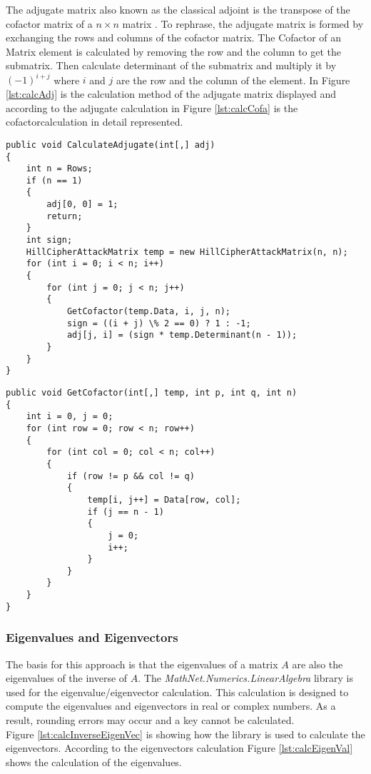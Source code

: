 \documentclass[conference]{IEEEtran}
\begin{document}
The adjugate matrix also known as the classical adjoint is the transpose of the cofactor matrix of a \( n \times n \) matrix . To rephrase, the adjugate matrix is formed by exchanging the rows and columns of the cofactor matrix.
The Cofactor of an Matrix element is calculated by removing the row and the column to get the submatrix. Then calculate determinant of the submatrix and multiply it by \((-1)^{i+j}\) where \(i\) and \(j\) are the row and the column of the element. 
In Figure \ref{lst:calcAdj} is the calculation method of the adjugate matrix displayed and according to the adjugate calculation in Figure \ref{lst:calcCofa} is the cofactorcalculation in detail represented.
\\

\begin{lstlisting}[caption={CalculateAdjugate method}, label={lst:calcAdj}]
public void CalculateAdjugate(int[,] adj)
{
    int n = Rows;
    if (n == 1)
    {
        adj[0, 0] = 1;
        return;
    }
    int sign;
    HillCipherAttackMatrix temp = new HillCipherAttackMatrix(n, n);
    for (int i = 0; i < n; i++)
    {
        for (int j = 0; j < n; j++)
        {
            GetCofactor(temp.Data, i, j, n);
            sign = ((i + j) \% 2 == 0) ? 1 : -1;
            adj[j, i] = (sign * temp.Determinant(n - 1));
        }
    }
}
\end{lstlisting}

\begin{lstlisting}[caption={GetCofactor method}, label={lst:calcCofa}]
public void GetCofactor(int[,] temp, int p, int q, int n)
{
    int i = 0, j = 0;
    for (int row = 0; row < n; row++)
    {
        for (int col = 0; col < n; col++)
        {
            if (row != p && col != q)
            {
                temp[i, j++] = Data[row, col];
                if (j == n - 1)
                {
                    j = 0;
                    i++;
                }
            }
        }
    }
}
\end{lstlisting}

\subsubsection{Eigenvalues and Eigenvectors}
The basis for this approach is that the eigenvalues of a matrix \(A\) are also the eigenvalues of the inverse of \(A\). The \textit{MathNet.Numerics.LinearAlgebra} library is used for the eigenvalue/eigenvector calculation. This calculation is designed to compute the eigenvalues and eigenvectors in real or complex numbers. As a result, rounding errors may occur and a key cannot be calculated.
\\
Figure \ref{lst:calcInverseEigenVec} is showing how the library is used to calculate the eigenvectors. According to the eigenvectors calculation Figure \ref{lst:calcEigenVal} shows the calculation of the eigenvalues.
\end{document}
